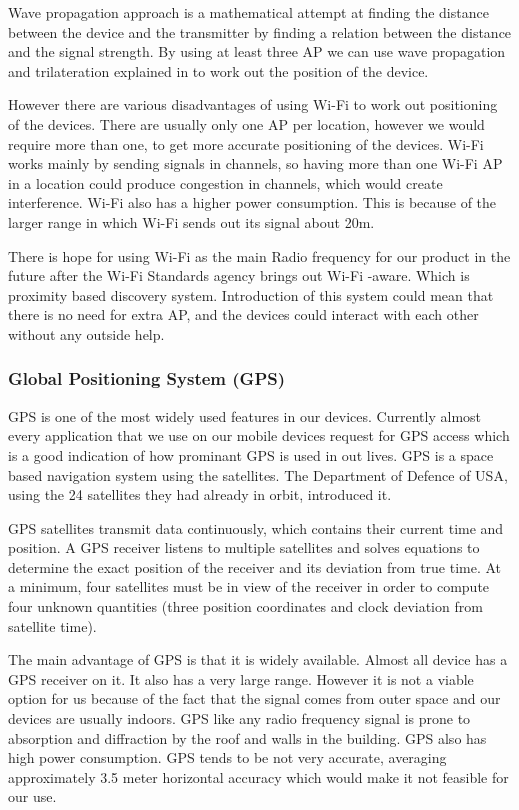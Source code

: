 Wave propagation approach is a mathematical attempt at finding the
distance between the device and the transmitter by finding a relation
between the distance and the signal strength. By using at least three
AP we can use wave propagation and trilateration explained in  to work out the position
of the device. 

However there are various disadvantages of using Wi-Fi to work out
positioning of the devices. There are usually only one AP per location,
however we would require more than one, to get more accurate positioning
of the devices. Wi-Fi works mainly by sending signals in channels,
so having more than one Wi-Fi AP in a location could produce congestion
in channels, which would create interference. Wi-Fi also has a higher
power consumption. This is because of the larger range in which Wi-Fi
sends out its signal about 20m\cite{wifi-wikipedia}. 

There is hope for using Wi-Fi as the main Radio frequency for our
product in the future after the Wi-Fi Standards agency brings out
Wi-Fi -aware. Which is proximity based discovery system. Introduction
of this system could mean that there is no need for extra  AP, and the devices could interact with each other without any
outside help. 


\subsubsection{Global Positioning System (GPS)}

GPS is one of the most widely used features in our devices. Currently almost every application that
we use on our mobile devices request for GPS access which is a good indication of
how prominant GPS is used in out lives. GPS is a space based navigation system
using the satellites. The Department of Defence of USA, using the
24 satellites they had already in orbit, introduced it\cite{gps_basics}. 

GPS satellites transmit data continuously, which contains their current
time and position. A GPS receiver listens to multiple satellites and
solves equations to determine the exact position of the receiver and
its deviation from true time. At a minimum, four satellites must be
in view of the receiver in order to compute four unknown quantities
(three position coordinates and clock deviation from satellite time). 

The main advantage of GPS is that it is widely available.
Almost all device has a GPS receiver on it. It also has a very large
range. However it is not a viable option for us because of the fact
that the signal comes from outer space and our devices are usually
indoors. GPS like any radio frequency signal is prone to absorption
and diffraction by the roof and walls in the building. GPS also has
high power consumption. GPS tends to be not very accurate, averaging
approximately 3.5 meter horizontal accuracy\cite{gps-accuracy} which would make it not feasible for our use. 


